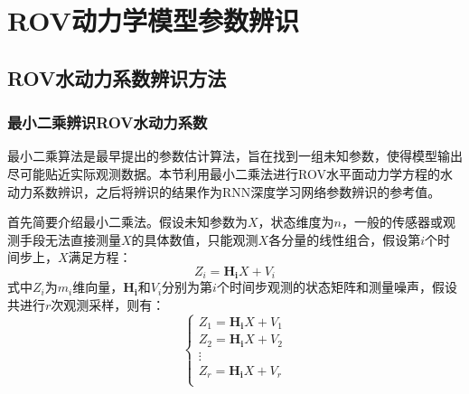 \chapter{ROV动力学模型参数辨识}
\section{ROV水动力系数辨识方法}

\subsection{最小二乘辨识ROV水动力系数}
最小二乘算法是最早提出的参数估计算法，旨在找到一组未知参数，使得模型输出尽可能贴近实际观测数据。本节利用最小二乘法进行ROV水平面动力学方程的水动力系数辨识，之后将辨识的结果作为RNN深度学习网络参数辨识的参考值。

首先简要介绍最小二乘法。假设未知参数为$X$，状态维度为$n$，一般的传感器或观测手段无法直接测量$X$的具体数值，只能观测$X$各分量的线性组合，假设第$i$个时间步上，$X$满足方程：\begin{equation}
    Z_i=\mathbf{H_i}X+V_i
\end{equation}
式中$Z_i$为$m_i$维向量，$\mathbf{H_i}$和$V_i$分别为第$i$个时间步观测的状态矩阵和测量噪声，假设共进行$r$次观测采样，则有：
\begin{equation}
\left\{\begin{matrix}
Z_1 = \mathbf{H_i}X+V_1\\
Z_2 = \mathbf{H_i}X+V_2\\
\vdots \\
Z_r = \mathbf{H_i}X+V_r\\
\end{matrix}\right. 
\end{equation}

